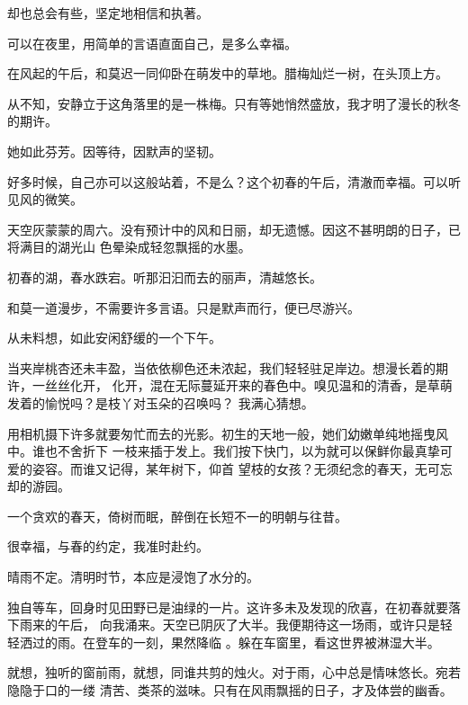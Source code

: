 \documentclass[12pt,a4paper]{article}
\begin{document}
		却也总会有些，坚定地相信和执著。

	\endwriting



		可以在夜里，用简单的言语直面自己，是多么幸福。

		在风起的午后，和莫迟一同仰卧在萌发中的草地。腊梅灿烂一树，在头顶上方。

		从不知，安静立于这角落里的是一株梅。只有等她悄然盛放，我才明了漫长的秋冬的期许。

		她如此芬芳。因等待，因默声的坚韧。

		好多时候，自己亦可以这般站着，不是么？这个初春的午后，清澈而幸福。可以听见风的微笑。

	\endwriting



		天空灰蒙蒙的周六。没有预计中的风和日丽，却无遗憾。因这不甚明朗的日子，已将满目的湖光山
	色晕染成轻忽飘摇的水墨。

		初春的湖，春水跌宕。听那汩汩而去的丽声，清越悠长。

		和莫一道漫步，不需要许多言语。只是默声而行，便已尽游兴。

		从未料想，如此安闲舒缓的一个下午。

		当夹岸桃杏还未丰盈，当依依柳色还未浓起，我们轻轻驻足岸边。想漫长着的期许，一丝丝化开，
	化开，混在无际蔓延开来的春色中。嗅见温和的清香，是草萌发着的愉悦吗？是枝丫对玉朵的召唤吗？
	我满心猜想。

		用相机摄下许多就要匆忙而去的光影。初生的天地一般，她们幼嫩单纯地摇曳风中。谁也不舍折下
	一枝来插于发上。我们按下快门，以为就可以保鲜你最真挚可爱的姿容。而谁又记得，某年树下，仰首
	望枝的女孩？无须纪念的春天，无可忘却的游园。

		一个贪欢的春天，倚树而眠，醉倒在长短不一的明朝与往昔。

		很幸福，与春的约定，我准时赴约。

	\endwriting




		晴雨不定。清明时节，本应是浸饱了水分的。

		独自等车，回身时见田野已是油绿的一片。这许多未及发现的欣喜，在初春就要落下雨来的午后，
	向我涌来。天空已阴灰了大半。我便期待这一场雨，或许只是轻轻洒过的雨。在登车的一刻，果然降临
	。躲在车窗里，看这世界被淋湿大半。

		就想，独听的窗前雨，就想，同谁共剪的烛火。对于雨，心中总是情味悠长。宛若隐隐于口的一缕
	清苦、类茶的滋味。只有在风雨飘摇的日子，才及体尝的幽香。
\end{document}

